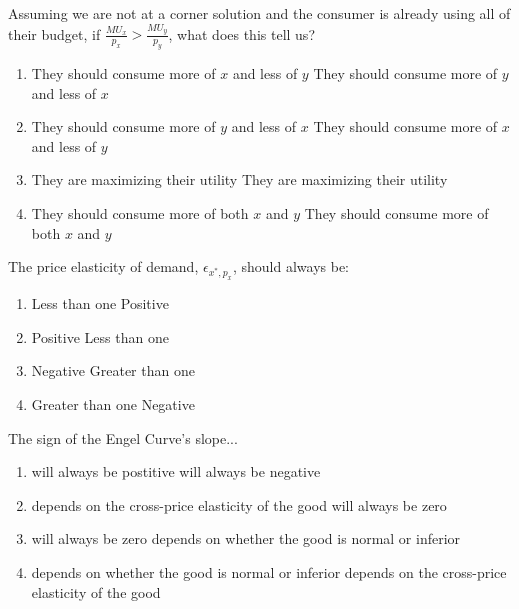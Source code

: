 \begin{question}[type=exam]{3}
  Assuming we are not at a corner solution and the consumer is already using all of their budget,
  if $\frac{MU_x}{p_x} > \frac{MU_y}{p_y}$, what does this tell us?
  \begin{enumerate}[label=\alph*), noitemsep]
    \item \vary
      {They should consume more of $x$ and less of $y$} %
      {They should consume more of $y$ and less of $x$}
    \item \vary
      {They should consume more of $y$ and less of $x$}
      {They should consume more of $x$ and less of $y$} %
    \item \vary
      {They are maximizing their utility}
      {They are maximizing their utility}
    \item \vary
      {They should consume more of both $x$ and $y$}
      {They should consume more of both $x$ and $y$}
  \end{enumerate}
\end{question}

\newpage

\begin{question}[type=exam]{3}
  The price elasticity of demand, $\epsilon_{x^*,p_x}$, should always be:
  \begin{enumerate}[label=\alph*), noitemsep]
    \item \vary
      {Less than one}
      {Positive}
    \item \vary
      {Positive}
      {Less than one}
    \item \vary
      {Negative} %
      {Greater than one}
    \item \vary
      {Greater than one}
      {Negative} %
  \end{enumerate}
\end{question}

\begin{question}[type=exam]{3}
  The sign of the Engel Curve's slope...
  \begin{enumerate}[label=\alph*), noitemsep]
    \item \vary
      {will always be postitive}
      {will always be negative}
    \item \vary
      {depends on the cross-price elasticity of the good}
      {will always be zero}
    \item \vary
      {will always be zero}
      {depends on whether the good is normal or inferior} %
    \item \vary
      {depends on whether the good is normal or inferior} %
      {depends on the cross-price elasticity of the good}
  \end{enumerate}
\end{question}

